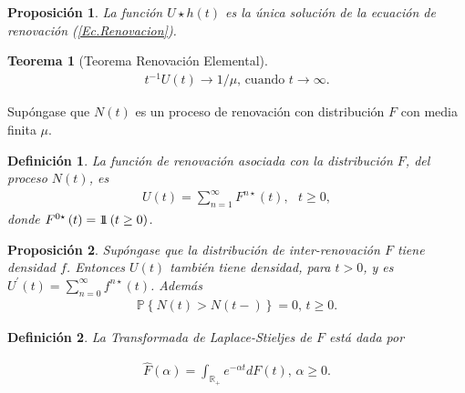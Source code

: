 \documentclass{article}
\newtheorem{Def}{Definición}
\newtheorem{Teo}{Teorema}
\newtheorem{Prop}{Proposición}
\newcommand{\rea}{\mathbb{R}}
\newcommand{\prob}{\mathbb{P}}
\newcommand{\indora}{\mbox{$1$\hspace{-0.8ex}$1$}}
\begin{document}
\begin{Prop}
La funci\'on $U\star h\left(t\right)$ es la \'unica soluci\'on de la ecuaci\'on de renovaci\'on (\ref{Ec.Renovacion}).
\end{Prop}

\begin{Teo}[Teorema Renovaci\'on Elemental]
\begin{eqnarray*}
t^{-1}U\left(t\right)\rightarrow 1/\mu\textrm{,    cuando }t\rightarrow\infty.
\end{eqnarray*}
\end{Teo}

%
%


Sup\'ongase que $N\left(t\right)$ es un proceso de renovaci\'on con distribuci\'on $F$ con media finita $\mu$.

\begin{Def}
La funci\'on de renovaci\'on asociada con la distribuci\'on $F$, del proceso $N\left(t\right)$, es
\begin{eqnarray*}
U\left(t\right)=\sum_{n=1}^{\infty}F^{n\star}\left(t\right),\textrm{   }t\geq0,
\end{eqnarray*}
donde $F^{0\star}\left(t\right)=\indora\left(t\geq0\right)$.
\end{Def}


\begin{Prop}
Sup\'ongase que la distribuci\'on de inter-renovaci\'on $F$ tiene densidad $f$. Entonces $U\left(t\right)$ tambi\'en tiene densidad, para $t>0$, y es $U^{'}\left(t\right)=\sum_{n=0}^{\infty}f^{n\star}\left(t\right)$. Adem\'as
\begin{eqnarray*}
\prob\left\{N\left(t\right)>N\left(t-\right)\right\}=0\textrm{,   }t\geq0.
\end{eqnarray*}
\end{Prop}

\begin{Def}
La Transformada de Laplace-Stieljes de $F$ est\'a dada por

\begin{eqnarray*}
\hat{F}\left(\alpha\right)=\int_{\rea_{+}}e^{-\alpha t}dF\left(t\right)\textrm{,  }\alpha\geq0.
\end{eqnarray*}
\end{Def}
\end{document}
